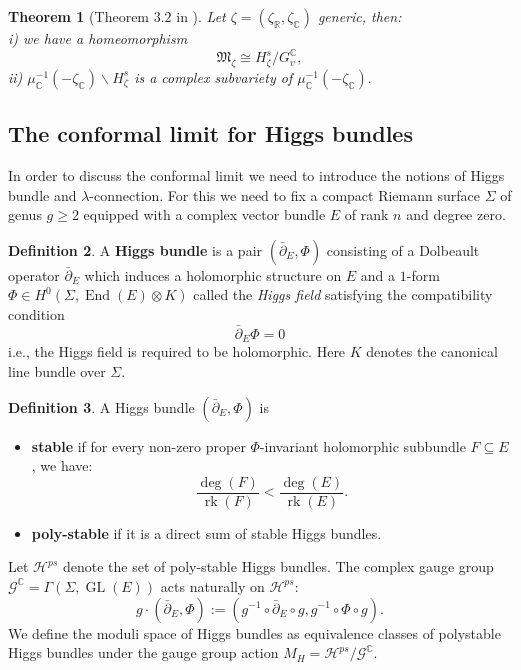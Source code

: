 \documentclass[12pt,oneside,reqno]{amsart}
\newtheorem{theorem}{Theorem}
\theoremstyle{definition}
\newtheorem{definition}[theorem]{Definition}
\numberwithin{equation}{section}
\numberwithin{theorem}{section}
\newcommand{\R}{\mathbb{R}}
\newcommand{\C}{\mathbb{C}}
\renewcommand{\subset}{\subseteq}
\newcommand{\pa}{\partial}
\newcommand{\del}{\partial}
\newcommand{\End}{\operatorname{End}}
\newcommand{\rk}{\operatorname{rk}}
\newcommand{\GL}{\operatorname{GL}}
\begin{document}
%
\begin{theorem}[Theorem $3.2$ in \cite{Na1994}]
    Let $\zeta =(\zeta_\R,\zeta_\C)$ generic, then: \\
    i) we have a homeomorphism 
    \begin{equation*}
        \mathfrak{M}_\zeta \cong H_\zeta ^s/G_v^\C,
    \end{equation*}
    ii) $\mu _\C ^{-1}(-\zeta_\C)\backslash H_\zeta^s $ is a complex subvariety of $\mu_\C^{-1}(-\zeta_\C).$
\end{theorem}
%

\subsection{The conformal limit for Higgs bundles}
In order to discuss the conformal limit we need to introduce the notions of Higgs bundle and $\lambda$-connection. For this we need to fix a compact Riemann surface $\Sigma$ of genus $g\ge 2$ equipped with a complex vector bundle $E$ of rank $n$ and degree zero.
% 
\begin{definition}\label{stabHB}
    A \textbf{Higgs bundle} is a pair $(\bar\pa_E, \Phi)$ consisting of a Dolbeault operator $\bar\pa_E$ which induces a holomorphic structure on $E$ and a $1$-form $\Phi\in H^0(\Sigma,\End( E)\otimes K)$ called the \emph{Higgs field} satisfying the compatibility condition 
    \begin{equation*}
    \bar\pa_E\Phi =0
    \end{equation*}
    i.e., the Higgs field is required to be holomorphic. Here $K$ denotes the canonical line bundle over $\Sigma$. 
\end{definition}
%

%
\begin{definition}
    A Higgs bundle $(\bar\pa_E,\Phi)$ is
    \begin{itemize}
    \item \textbf{stable} if for every non-zero proper $\Phi$-invariant holomorphic subbundle $F\subset E$, we have:
    \begin{equation}
    \frac{\deg(F)}{\rk (F)} < \frac{\deg(E)}{\rk(E)}. 
    \end{equation}
    \item \textbf{poly-stable} if it is a direct sum of stable Higgs bundles.
    \end{itemize}
\end{definition}
%
Let $\mathcal H^{ps}$ denote the set of poly-stable Higgs bundles. The complex gauge group $\mathcal{G}^\C=\Gamma(\Sigma,\GL(E))$ acts naturally on $\mathcal H^{ps}$:
%
\begin{equation*}
    g\cdot (\bar \del _E,\Phi):=(g^{-1}\circ\bar \del_E \circ g, g^{-1}\circ \Phi \circ g).
\end{equation*}
%
We define the moduli space of Higgs bundles as equivalence classes of polystable Higgs bundles under the gauge group action $M_H = \mathcal H^{ps}/\mathcal G^{\C}$. 
\end{document}
